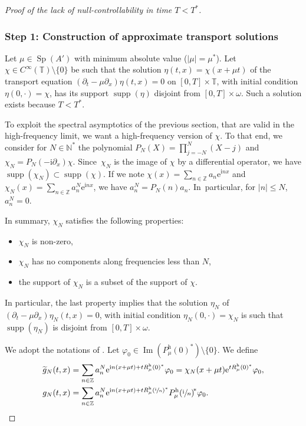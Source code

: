 \documentclass[JEP,XML,SOM,Unicode,NoEqCountersInSection]{cedram}
\theoremstyle{plain}
\theoremstyle{definition}
\theoremstyle{remark}
\DeclareMathOperator{\Sp}{Sp}
\DeclareMathOperator{\Ima}{Im}
\DeclareMathOperator{\Supp}{supp}
\newcommand{\set}{\mathbb}
\newcommand{\h}{{\mathrm h}}
\newcommand{\eu}{\mathrm e}
\newcommand{\iu}{\mathrm i}
\let\originalleft\left
\let\originalright\right
\renewcommand{\left}{\mathopen{}\mathclose\bgroup\originalleft}
\renewcommand{\right}{\aftergroup\egroup\originalright}
\newcommand{\iun}{\left(\sfrac{\iu}{n}\right)}
\begin{document}
\skpt
\begin{proof}[Proof of the lack of null-controllability in time $T<T^*$]

\subsubsection*{Step 1: Construction of approximate transport solutions} Let $\mu \in \Sp(A')$ with minimum absolute value (\ie $|\mu| = \mu^*$). Let $\chi\in C^\infty(\set T)\setminus\{0\}$ be such that the solution $\eta(t,x)=\chi(x+\mu t)$ of the transport equation $(\partial_t-\mu\partial_x)\eta(t,x) = 0$ on $[0,T]\times\set T$, with initial condition $\eta(0,\cdot) = \chi$, has its support $\Supp(\eta)$ disjoint from $[0,T]\times \omega$. Such a solution exists because $T<T^*$.

To exploit the spectral asymptotics of the previous section, that are valid in the high-frequency limit, we want a high-frequency version of $\chi$. To that end, we consider for $N\in\set N^*$ the polynomial $P_N(X) = \prod_{j=-N}^N(X-j)$ and $\chi_N = P_N(-\iu \partial_x)\chi$. Since~$\chi_N$ is the image of $\chi$ by a differential operator, we have $\Supp(\chi_N)\subset \Supp(\chi)$. If we note $\chi(x) = \sum_{n\in\set Z} a_n \eu^{\iu nx}$ and $\chi_N(x) = \sum_{n\in\set Z} a_n^N \eu^{\iu nx}$, we have $a_n^N = P_N(n) a_n$. In~particular, for $|n|\leq N$, $a_n^N = 0$.

In summary, $\chi_N$ satisfies the following properties:
\begin{itemize}
\item $\chi_N$ is non-zero,
\item $\chi_N$ has no components along frequencies less than $N$,
\item the support of $\chi_N$ is a subset of the support of $\chi$.
\end{itemize}
In particular, the last property implies that the solution $\eta_N$ of $(\partial_t-\mu\partial_x)\eta_N(t,x) = 0$, with initial condition $\eta_N(0,\cdot) = \chi_N$ is such that $\Supp(\eta_N)$ is disjoint from $[0,T]\times \omega$.

We adopt the notations of . Let $\varphi_0\in\Ima(P_\mu^\h(0)^*)\setminus\{0\}$. We define
\begin{align}
\widetilde g_N(t,x)
&= \sum_{n\in\set Z} a_n^N \eu^{\iu n(x+\mu t)+tR_\mu^\h(0)^*}\varphi_0
= \chi_N(x+\mu t)\eu^{tR_\mu^\h(0)^*}\varphi_0\label{eq:def_gN_approx},\\
g_N(t,x)
&=\sum_{n\in\set Z} a_n^N
\eu^{\iu n(x+\mu t) +tR_\mu^\h\iun^*}P_\mu^\h\iun^{\!*}\varphi_0. \label{eq:def_gN}
\end{align}


\end{proof}
\end{document}
